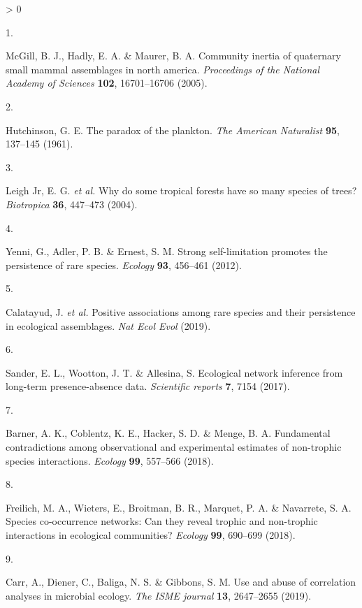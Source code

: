 \documentclass[
]{article}
\newlength{\cslhangindent}
\newlength{\csllabelwidth}
\newenvironment{CSLReferences}[2] %
 {%
  \setlength{\parindent}{0pt}
  \ifodd #1 \everypar{\setlength{\hangindent}{\cslhangindent}}\ignorespaces\fi
  \ifnum #2 > 0
  \setlength{\parskip}{#2\baselineskip}
  \fi
 }%
 {}
\newcommand{\CSLLeftMargin}[1]{\parbox[t]{\csllabelwidth}{#1}}
\newcommand{\CSLRightInline}[1]{\parbox[t]{\linewidth - \csllabelwidth}{#1}\break}
\begin{document}
\hypertarget{refs}{}
\begin{CSLReferences}{0}{0}
\leavevmode\hypertarget{ref-mcgill2005}{}%
\CSLLeftMargin{1. }
\CSLRightInline{McGill, B. J., Hadly, E. A. \& Maurer, B. A. Community
inertia of quaternary small mammal assemblages in north america.
\emph{Proceedings of the National Academy of Sciences} \textbf{102},
16701--16706 (2005).}

\leavevmode\hypertarget{ref-hutchinson1961}{}%
\CSLLeftMargin{2. }
\CSLRightInline{Hutchinson, G. E. The paradox of the plankton. \emph{The
American Naturalist} \textbf{95}, 137--145 (1961).}

\leavevmode\hypertarget{ref-leigh2004}{}%
\CSLLeftMargin{3. }
\CSLRightInline{Leigh Jr, E. G. \emph{et al.} Why do some tropical
forests have so many species of trees? \emph{Biotropica} \textbf{36},
447--473 (2004).}

\leavevmode\hypertarget{ref-yenni2012}{}%
\CSLLeftMargin{4. }
\CSLRightInline{Yenni, G., Adler, P. B. \& Ernest, S. M. Strong
self-limitation promotes the persistence of rare species. \emph{Ecology}
\textbf{93}, 456--461 (2012).}

\leavevmode\hypertarget{ref-calatayud2019}{}%
\CSLLeftMargin{5. }
\CSLRightInline{Calatayud, J. \emph{et al.} Positive associations among
rare species and their persistence in ecological assemblages. \emph{Nat
Ecol Evol} (2019).}

\leavevmode\hypertarget{ref-sander2017}{}%
\CSLLeftMargin{6. }
\CSLRightInline{Sander, E. L., Wootton, J. T. \& Allesina, S. Ecological
network inference from long-term presence-absence data. \emph{Scientific
reports} \textbf{7}, 7154 (2017).}

\leavevmode\hypertarget{ref-barner2018}{}%
\CSLLeftMargin{7. }
\CSLRightInline{Barner, A. K., Coblentz, K. E., Hacker, S. D. \& Menge,
B. A. Fundamental contradictions among observational and experimental
estimates of non-trophic species interactions. \emph{Ecology}
\textbf{99}, 557--566 (2018).}

\leavevmode\hypertarget{ref-freilich2018}{}%
\CSLLeftMargin{8. }
\CSLRightInline{Freilich, M. A., Wieters, E., Broitman, B. R., Marquet,
P. A. \& Navarrete, S. A. Species co-occurrence networks: Can they
reveal trophic and non-trophic interactions in ecological communities?
\emph{Ecology} \textbf{99}, 690--699 (2018).}

\leavevmode\hypertarget{ref-carr2019}{}%
\CSLLeftMargin{9. }
\CSLRightInline{Carr, A., Diener, C., Baliga, N. S. \& Gibbons, S. M.
Use and abuse of correlation analyses in microbial ecology. \emph{The
ISME journal} \textbf{13}, 2647--2655 (2019).}


\end{CSLReferences}
\end{document}

